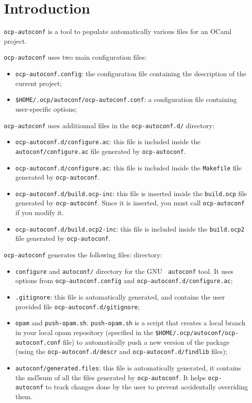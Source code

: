 
\section{Introduction}

{\tt ocp-autoconf} is a tool to populate automatically various files for
an OCaml project.

\noindent
{\tt ocp-autoconf} uses two main configuration files:
\begin{itemize}
\item {\tt ocp-autoconf.config}: the configuration file containing the
  description of the current project;
\item {\tt \$HOME/.ocp/autoconf/ocp-autoconf.conf}: a configuration
  file containing user-specific options;
\end{itemize}

\noindent
{\tt ocp-autoconf} uses additionnal files in the {\tt ocp-autoconf.d/}
directory:
\begin{itemize}
\item {\tt ocp-autoconf.d/configure.ac}: this file is included inside
  the {\tt autoconf/configure.ac} file generated by {\tt ocp-autoconf}.
\item {\tt ocp-autoconf.d/configure.ac}: this file is included inside
  the {\tt Makefile} file generated by {\tt ocp-autoconf}.
\item {\tt ocp-autoconf.d/build.ocp-inc}: this file is inserted inside
  the {\tt build.ocp} file generated by {\tt ocp-autoconf}. Since it is
  inserted, you must call {\tt ocp-autoconf} if you modify it.
\item {\tt ocp-autoconf.d/build.ocp2-inc}: this file is included inside
  the {\tt build.ocp2} file generated by {\tt ocp-autoconf}.
\end{itemize}

\noindent
{\tt ocp-autoconf} generates the following files:
directory:
\begin{itemize}
\item {\tt configure} and {\tt autoconf/} directory for the GNU {\tt
  autoconf} tool. It uses options from {\tt ocp-autoconf.config} and
  {\tt ocp-autoconf.d/configure.ac};
\item {\tt .gitignore}: this file is automatically generated, and contains
  the user provided file {\tt ocp-autoconf.d/gitignore};
\item {\tt opam} and {\tt push-opam.sh}. {\tt push-opam.sh} is a script that
  creates a local branch in your local opam repository (specified in the
  {\tt \$HOME/.ocp/autoconf/ocp-autoconf.conf} file) to automatically push
  a new version of the package (using the {\tt ocp-autoconf.d/descr}
  and {\tt ocp-autoconf.d/findlib} files);
\item {\tt autoconf/generated.files}: this file is automatically generated, it
  contains the md5sum of all the files generated by
  {\tt ocp-autoconf}. It helps {\tt ocp-autoconf} to track changes done
  by the user to prevent accidentally overriding them.
\end{itemize}

